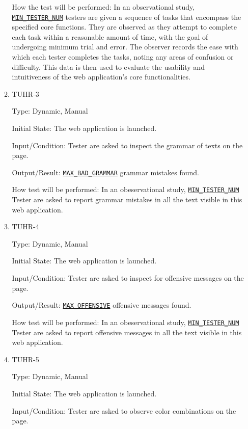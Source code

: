 \documentclass[12pt, titlepage]{article}
\begin{document}
\begin{enumerate}
\begin{enumerate}
How the test will be performed: In an observational study, \hyperref[MIN_TESTER_NUM]{\texttt{MIN\_TESTER\_NUM}} testers are given a sequence of tasks that encompass the specified core functions. They are observed as they attempt to complete each task within a reasonable amount of time, with the goal of undergoing minimum trial and error. The observer records the ease with which each tester completes the tasks, noting any areas of confusion or difficulty. This data is then used to evaluate the usability and intuitiveness of the web application's core functionalities.

\item{TUHR-3\\}\label{TUHR-3}

Type: Dynamic, Manual
					
Initial State: The web application is launched.
					
Input/Condition: Tester are asked to inspect the grammar of texts on the page.
					
Output/Result: \hyperref[MAX_BAD_GRAMMAR]{\texttt{MAX\_BAD\_GRAMMAR}} grammar mistakes found.
					
How test will be performed: In an obeservational study, \hyperref[MIN_TESTER_NUM]{\texttt{MIN\_TESTER\_NUM}} Tester are asked to report grammar mistakes in all the text visible in this web application.

\item{TUHR-4\\}\label{TUHR-4}

Type: Dynamic, Manual
					
Initial State: The web application is launched.
					
Input/Condition: Tester are asked to inspect for offensive messages on the page.
					
Output/Result: \hyperref[MAX_OFFENSIVE]{\texttt{MAX\_OFFENSIVE}} offensive messages found.
					
How test will be performed: In an obeservational study, \hyperref[MIN_TESTER_NUM]{\texttt{MIN\_TESTER\_NUM}} Tester are asked to report offensive messages in all the text visible in this web application.

\item{TUHR-5\\}\label{TUHR-5}

Type: Dynamic, Manual
					
Initial State: The web application is launched.
					
Input/Condition: Tester are asked to observe color combinations on the page.
					

\end{enumerate}
\end{enumerate}
\end{document}
